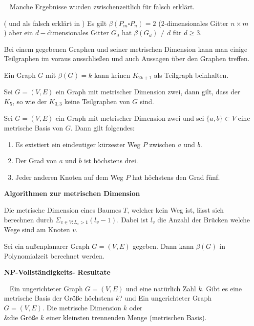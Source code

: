 ~\newline
Manche Ergebnisse wurden zwischenzeitlich für falsch erklärt. 
\begin{lem}(\cite{landmarks} und als falsch erklärt in \cite{somefamiliesofgraphs})
Es gilt $\beta(P_m \square P_n)=2$ (2-dimensionales Gitter $n \times m$) aber ein $d-$dimensionales Gitter $G_d$ hat $\beta(G_d) \neq d$ für $d \geq 3$.
\end{lem}
Bei einem gegebenen Graphen und seiner metrischen Dimension kann man einige Teilgraphen im voraus ausschließen und auch Aussagen über den Graphen treffen.
\begin{lem}
Ein Graph $G$ mit $\beta(G) = k$ kann keinen $K_{2k+1}$ als Teilgraph beinhalten.\cite{landmarks}
\end{lem}
\begin{lem}\cite{landmarks}
Sei $G = (V, E)$ ein Graph mit metrischer Dimension zwei, dann gilt, dass der $K_{5}$, so wie der $K_{3,3}$ keine Teilgraphen von $G$ sind.
\end{lem}
\begin{lem}\cite{landmarks}
Sei $G = (V, E)$ ein Graph mit metrischer Dimension zwei und sei $\{a, b\} \subset V$ eine metrische Basis von $G$. Dann gilt folgendes:
\begin{enumerate}
\item Es existiert ein eindeutiger kürzester Weg $P$ zwischen $a$ und $b$.
\item Der Grad von $a$ und $b$ ist höchstens drei.
\item Jeder anderen Knoten auf dem Weg $P$ hat höchstens den Grad fünf.
\end{enumerate}
\end{lem}
\textbf{Algorithmen zur metrischen Dimension}
\begin{lem}\cite{landmarks} 
\label{baum}
Die metrische Dimension eines Baumes $T$, welcher kein Weg ist, lässt sich berechnen durch $\Sigma_{v \in V:L_v >1} (l_v-1)$. Dabei ist $l_v$ die Anzahl der Brücken welche Wege sind am Knoten $v$.
\end{lem}
\begin{lem}\cite{onthecomplexity}
Sei ein außenplanarer Graph $G=(V,E)$ gegeben. Dann kann $\beta(G)$ in Polynomialzeit berechnet werden.
\end{lem}
\textbf{NP-Vollständigkeits- Resultate}
\begin{defi}~\newline
\vspace{-7mm}
{Ein ungerichteter Graph $G=(V,E)$ und eine natürlich Zahl $k$.}
{Gibt es eine metrische Basis der Größe höchstens $k$?}
\vspace{-2mm}
\centering und
\vspace{-1mm}
{Ein ungerichteter Graph $G=(V,E)$.}
{Die metrische Dimension $k$ oder\\&die Größe $k$ einer kleinsten trennenden Menge (metrischen Basis).}
\end{defi}
